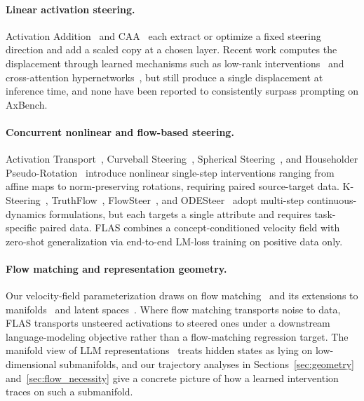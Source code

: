\documentclass{article}
\begin{document}
\paragraph{Linear activation steering.}
Activation Addition~\citep{Turner2024} and CAA~\citep{Panickssery2024} each extract or optimize a fixed steering direction and add a scaled copy at a chosen layer. Recent work computes the displacement through learned mechanisms such as low-rank interventions~\citep{Wu2024} and cross-attention hypernetworks~\citep{Sun2025}, but still produce a single displacement at inference time, and none have been reported to consistently surpass prompting on AxBench.

\paragraph{Concurrent nonlinear and flow-based steering.}
Activation Transport~\citep{Rodriguez2024a}, Curveball Steering~\citep{Raval2026}, Spherical Steering~\citep{You2026}, and Householder Pseudo-Rotation~\citep{Pham2024} introduce nonlinear single-step interventions ranging from affine maps to norm-preserving rotations, requiring paired source-target data. K-Steering~\citep{Oozeer2026}, TruthFlow~\citep{Wang2025a}, FlowSteer~\citep{Li2026}, and ODESteer~\citep{Zhao2026} adopt multi-step continuous-dynamics formulations, but each targets a single attribute and requires task-specific paired data. FLAS combines a concept-conditioned velocity field with zero-shot generalization via end-to-end LM-loss training on positive data only.

\paragraph{Flow matching and representation geometry.}
Our velocity-field parameterization draws on flow matching~\citep{Lipman2023, Tong2024, Lipman2024} and its extensions to manifolds~\citep{Ben-Hamu2022} and latent spaces~\citep{Dao2023}. Where flow matching transports noise to data, FLAS transports unsteered activations to steered ones under a downstream language-modeling objective rather than a flow-matching regression target. The manifold view of LLM representations~\citep{Modell2025, Valeriani2023, Mabrok2026, Facco2017, Yusupov2025} treats hidden states as lying on low-dimensional submanifolds, and our trajectory analyses in Sections~\ref{sec:geometry} and~\ref{sec:flow_necessity} give a concrete picture of how a learned intervention traces on such a submanifold.
\end{document}
